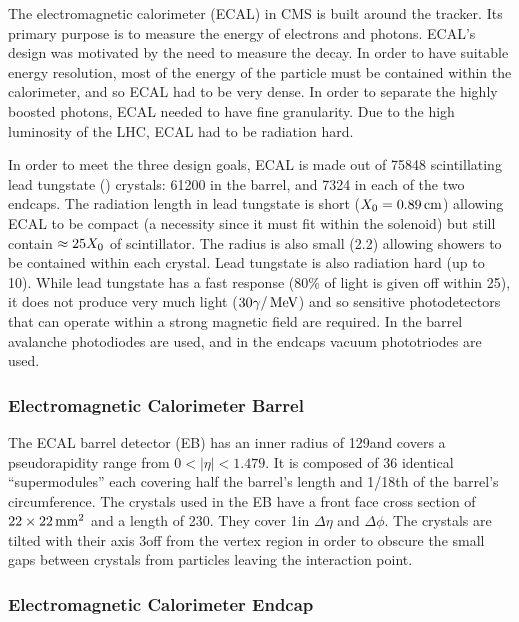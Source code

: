 The electromagnetic calorimeter (ECAL) in CMS is built around the tracker. Its
primary purpose is to measure the energy of electrons and photons. ECAL's
design was motivated by the need to measure the \higgstogammagamma decay. In
order to have suitable energy resolution, most of the energy of the particle
must be contained within the calorimeter, and so ECAL had to be very dense. In
order to separate the highly boosted photons, ECAL needed to have fine
granularity. Due to the high luminosity of the LHC, ECAL had to be radiation
hard.

In order to meet the three design goals, ECAL is made out of 75848
scintillating lead tungstate (\leadtungstate) crystals: 61200 in the barrel,
and 7324 in each of the two endcaps. The radiation length in lead tungstate is
short ($X_{0} = 0.89\text{\,cm}$) allowing ECAL to be compact (a
necessity since it must fit within the solenoid) but still contain $\approx
25X_{0}$ of scintillator. The \Moliere radius is also small
(2.2\centimeters) allowing showers to be contained within each crystal. Lead
tungstate is also radiation hard (up to 10\megarads). While lead tungstate has
a fast response (80\% of light is given off within 25\ns), it does not produce
very much light ($30 \gamma / \,\text{Me\hspace{-.08em}V}$) and so sensitive photodetectors that can
operate within a strong magnetic field are required. In the barrel avalanche
photodiodes are used, and in the endcaps vacuum phototriodes are used.

\subsubsection{Electromagnetic Calorimeter Barrel}

The ECAL barrel detector (EB) has an inner radius of 129\centimeters and covers
a pseudorapidity range from $0 < |\eta| < 1.479$. It is composed of 36
identical ``supermodules'' each covering half the barrel's length and 1/18th of
the barrel's circumference. The crystals used in the EB have a front face
cross section of $22 \times 22\text{\,mm}^{2}$ and a length of
230\millimeters. They cover 1\degrees in $\Delta \eta$ and $\Delta \phi$. The
crystals are tilted with their axis 3\degrees off from the vertex region in
order to obscure the small gaps between crystals from particles leaving the
interaction point.

\subsubsection{Electromagnetic Calorimeter Endcap}

